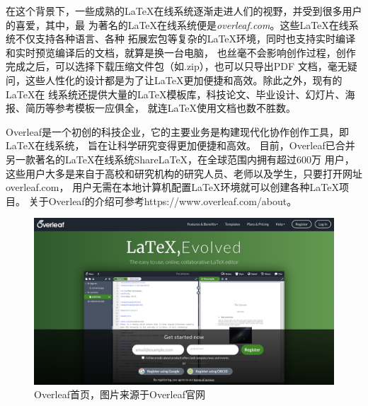 在这个背景下，一些成熟的LaTeX在线系统逐渐走进人们的视野，并受到很多用户的喜爱，其中，最
为著名的LaTeX在线系统便是\emph{overleaf.com}。这些LaTeX在线系统不仅支持各种语言、各种
拓展宏包等复杂的LaTeX环境，同时也支持实时编译和实时预览编译后的文档，就算是换一台电脑，
也丝毫不会影响创作过程，创作完成之后，可以选择下载压缩文件包（如.zip），也可以只导出PDF
文档，毫无疑问，这些人性化的设计都是为了让LaTeX更加便捷和高效。除此之外，现有的LaTeX在
线系统还提供大量的LaTeX模板库，科技论文、毕业设计、幻灯片、海报、简历等参考模板一应俱全，
就连LaTeX使用文档也数不胜数。

\begin{tcolorbox}[colback=red!5!white, colframe=red!50!black, title=在线系统 overleaf]
    Overleaf是一个初创的科技企业，它的主要业务是构建现代化协作创作工具，即LaTeX在线系统，
    旨在让科学研究变得更加便捷和高效。
    目前，Overleaf已合并另一款著名的LaTeX在线系统ShareLaTeX，在全球范围内拥有超过600万
    用户，这些用户大多是来自于高校和研究机构的研究人员、老师以及学生，只要打开网址overleaf.com，
    用户无需在本地计算机配置LaTeX环境就可以创建各种LaTeX项目。
    \tcblower
    关于Overleaf的介绍可参考https://www.overleaf.com/about。
\end{tcolorbox}

\begin{figure}
    \centering
    \includegraphics[width=\textwidth]{images/overleaf_webpage.png}
    \caption{Overleaf首页，图片来源于Overleaf官网}
\end{figure}

